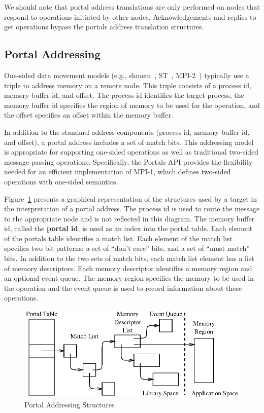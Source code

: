 \documentclass{sand-report}
\begin{document}
We should note that portal address translations are only performed on
nodes that respond to operations initiated by other nodes.
Acknowledgements and replies to get operations bypass the portals
address translation structures.

\subsection{Portal Addressing}

One-sided data movement models (e.g., shmem~\cite{CraySHMEM},
ST~\cite{ST}, MPI-2~\cite{MPI2}) typically use a triple to address
memory on a remote node.  This triple consists of a process id, memory
buffer id, and offset.  The process id identifies the target process,
the memory buffer id specifies the region of memory to be used for the
operation, and the offset specifies an offset within the memory
buffer.

In addition to the standard address components (process id, memory
buffer id, and offset), a portal address includes a set of match bits.
This addressing model is appropriate for supporting one-sided
operations as well as traditional two-sided message passing
operations.  Specifically, the Portals API provides the flexibility
needed for an efficient implementation of MPI-1, which defines
two-sided operations with one-sided semantics.

Figure~\ref{fig:portals} presents a graphical representation of the
structures used by a target in the interpretation of a portal address.
The process id is used to route the message to the appropriate node
and is not reflected in this diagram.  The memory buffer id, called
the \textbf{portal id}, is used as an index into the portal table.
Each element of the portals table identifies a match list.  Each
element of the match list specifies two bit patterns: a set of ``don't
care'' bits, and a set of ``must match'' bits.  In addition to the two
sets of match bits, each match list element has a list of memory
descriptors.  Each memory descriptor identifies a memory region and an
optional event queue.  The memory region specifies the memory to be
used in the operation and the event queue is used to record
information about these operations.

\begin{figure}[htbp]
\centerline{\includegraphics{portals.eps}}
\caption{Portal Addressing Structures}
\label{fig:portals}
\end{figure}
\end{document}
